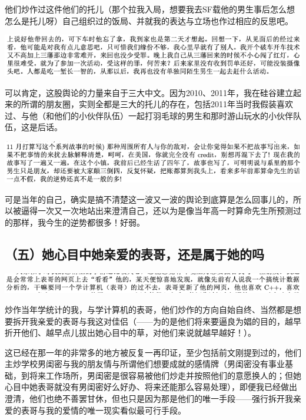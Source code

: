 \documentclass[9pt, b5paper]{article}
\begin{document}
他们炒作过这件他们的托儿（那个拉我入局，想要我去SF载他的男生事后怎么想怎么是托儿呀）自己组织过的饭局、并就我的表达与立场也作过相应的反思吧。

\begin{center}
\includegraphics[width=.9\linewidth]{./pic/backups_plans_20210424_093212.png}
\end{center}

可以肯定，这股舆论的力量来自于三大中文。因为2010、2011年，我在硅谷建立起来的所谓的朋友圈，实则全都是三大的托儿的存在，包括2011年当时我假装喜欢过、与他（和他们的小伙伴队伍）一起打羽毛球的男生和那时游山玩水的小伙伴队伍，这是后话。

\begin{center}
\includegraphics[width=.9\linewidth]{./pic/backups_plans_20210501_123450.png}
\end{center}

可是当年的自己，确实是搞不清楚这一波又一波的舆论到底算是怎么回事儿的，所以被逼得一次又一次地站出来澄清自己，还以为是像当年高一时算命先生所预测过的那样，我今生的逆势都很多！好弱。

\subsection{（五）她心目中她亲爱的表哥，还是属于她的吗}
\label{sec:org8f966da}

\begin{center}
\includegraphics[width=.9\linewidth]{./pic/backups_plans_20210424_133752.png}
\end{center}

炒作当年学统计的我，与学计算机的表哥，他们炒作的方向自始自终、当然都是想要拆开我亲爱的表哥与我这对佳侣（——为的是他们将来要逼良为娼的目的，越早折开他们、越早点儿拔出她心目中的草，对他们来说就越早越好！）。

这已经在那一年的非常多的地方被反复一再印证，至少包括前文刚提到过的，他们主炒学校男闺密与我的朋友情与所谓他们想要成就的感情牌（男闺密没有事业基础，到将来工作场所，男闺密是很容易被他们炒走并按照他们的意愿换人的；但她心目中她表哥就没有男闺密好么好办、将来还能那么容易处理），即便我已经做出澄清，他们也绝不善罢甘休，但也只是因为那是他们的唯一手段——强行拆开我亲爱的表哥与我的爱情的唯一现实看似最可行手段。
\end{document}
